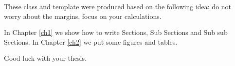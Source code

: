 These class and template were produced based on the following idea: do not worry about the margins, focus on your calculations.

In Chapter \ref{ch1} we show how to write Sections, Sub Sections and Sub sub Sections. In Chapter \ref{ch2} we put some figures and tables.

Good luck with your thesis.